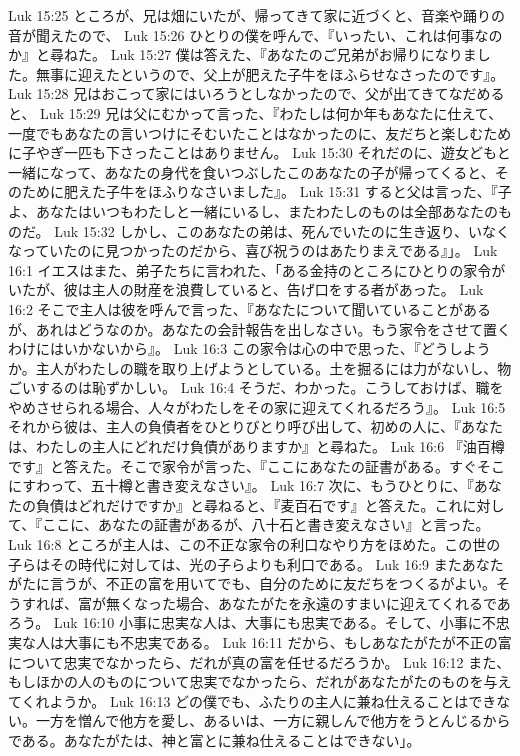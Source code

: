 Luk 15:25  ところが、兄は畑にいたが、帰ってきて家に近づくと、音楽や踊りの音が聞えたので、
Luk 15:26  ひとりの僕を呼んで、『いったい、これは何事なのか』と尋ねた。
Luk 15:27  僕は答えた、『あなたのご兄弟がお帰りになりました。無事に迎えたというので、父上が肥えた子牛をほふらせなさったのです』。
Luk 15:28  兄はおこって家にはいろうとしなかったので、父が出てきてなだめると、
Luk 15:29  兄は父にむかって言った、『わたしは何か年もあなたに仕えて、一度でもあなたの言いつけにそむいたことはなかったのに、友だちと楽しむために子やぎ一匹も下さったことはありません。
Luk 15:30  それだのに、遊女どもと一緒になって、あなたの身代を食いつぶしたこのあなたの子が帰ってくると、そのために肥えた子牛をほふりなさいました』。
Luk 15:31  すると父は言った、『子よ、あなたはいつもわたしと一緒にいるし、またわたしのものは全部あなたのものだ。
Luk 15:32  しかし、このあなたの弟は、死んでいたのに生き返り、いなくなっていたのに見つかったのだから、喜び祝うのはあたりまえである』」。
Luk 16:1  イエスはまた、弟子たちに言われた、「ある金持のところにひとりの家令がいたが、彼は主人の財産を浪費していると、告げ口をする者があった。
Luk 16:2  そこで主人は彼を呼んで言った、『あなたについて聞いていることがあるが、あれはどうなのか。あなたの会計報告を出しなさい。もう家令をさせて置くわけにはいかないから』。
Luk 16:3  この家令は心の中で思った、『どうしようか。主人がわたしの職を取り上げようとしている。土を掘るには力がないし、物ごいするのは恥ずかしい。
Luk 16:4  そうだ、わかった。こうしておけば、職をやめさせられる場合、人々がわたしをその家に迎えてくれるだろう』。
Luk 16:5  それから彼は、主人の負債者をひとりびとり呼び出して、初めの人に、『あなたは、わたしの主人にどれだけ負債がありますか』と尋ねた。
Luk 16:6  『油百樽です』と答えた。そこで家令が言った、『ここにあなたの証書がある。すぐそこにすわって、五十樽と書き変えなさい』。
Luk 16:7  次に、もうひとりに、『あなたの負債はどれだけですか』と尋ねると、『麦百石です』と答えた。これに対して、『ここに、あなたの証書があるが、八十石と書き変えなさい』と言った。
Luk 16:8  ところが主人は、この不正な家令の利口なやり方をほめた。この世の子らはその時代に対しては、光の子らよりも利口である。
Luk 16:9  またあなたがたに言うが、不正の富を用いてでも、自分のために友だちをつくるがよい。そうすれば、富が無くなった場合、あなたがたを永遠のすまいに迎えてくれるであろう。
Luk 16:10  小事に忠実な人は、大事にも忠実である。そして、小事に不忠実な人は大事にも不忠実である。
Luk 16:11  だから、もしあなたがたが不正の富について忠実でなかったら、だれが真の富を任せるだろうか。
Luk 16:12  また、もしほかの人のものについて忠実でなかったら、だれがあなたがたのものを与えてくれようか。
Luk 16:13  どの僕でも、ふたりの主人に兼ね仕えることはできない。一方を憎んで他方を愛し、あるいは、一方に親しんで他方をうとんじるからである。あなたがたは、神と富とに兼ね仕えることはできない」。
